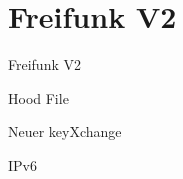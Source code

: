 \section{Freifunk V2}

\begin{frame}{}
    \begin{center}
        Freifunk V2
     \end{center}
\end{frame}

\begin{frame}{Hood File}
\end{frame}

\begin{frame}{Neuer keyXchange}
\end{frame}

\begin{frame}{IPv6}
\end{frame}
